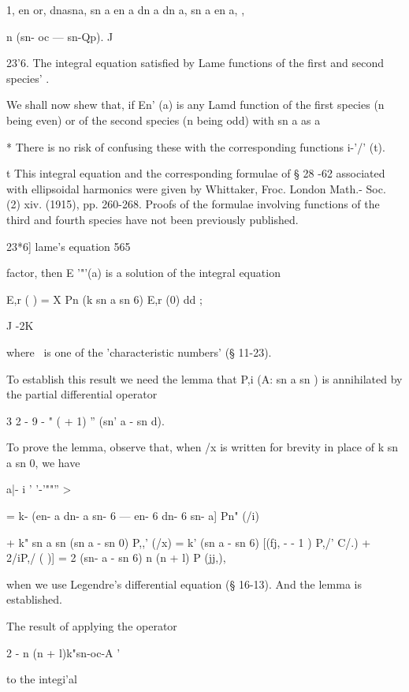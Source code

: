 {{{{{{{1, en or, dnasna, sn a en a dn a 
dn a, sn a en a, , 



n (sn- oc — sn-Qp). 
J  



23'6. The integral equation satisfied by Lame functions of the first and 
second species' . 

We shall now shew that, if En' (a) is any Lamd function of the first 
species (n being even) or of the second species (n being odd) with sn a as a 

* There is no risk of confusing these with the corresponding functions i-'/' (t). 

t This integral equation and the corresponding formulae of § 28 -62 associated with ellipsoidal 
harmonics were given by Whittaker, Froc. London Math.- Soc. (2) xiv. (1915), pp. 260-268. 
Proofs of the formulae involving functions of the third and fourth species have not been 
previously published. 



23*6] lame's equation 565 

factor, then E '"'(a) is a solution of the integral equation 

E,r ( ) = X Pn (k sn a sn 6) E,r (0) dd ; 

J -2K 

where \ is one of the 'characteristic numbers' (§ 11-23). 

To establish this result we need the lemma that P,i (A: sn a sn  ) is 
annihilated by the partial differential operator 

3 2 - 9  - " (  + 1)  '' (sn' a - sn  d). 

To prove the lemma, observe that, when /x is written for brevity in place 
of k sn a sn 0, we have 



 a|- i '  '-'""''  > 



= k- (en- a dn- a sn- 6 — en- 6 dn- 6 sn- a] Pn" (/i) 

+  k" sn a sn   (sn  a - sn  0) P,,' (/x) 
= k' (sn  a - sn  6) [(fj, - - 1 ) P,/' C/.) + 2/iP,/ ( )] 
=  2 (sn- a - sn  6) n (n + l) P  (jj,), 

when we use Legendre's differential equation (§ 16-13). And the lemma is 
established. 

The result of applying the operator 

 2 - n (n + l)k"sn-oc-A  '  

to the integi'al 

}}}}}}}
